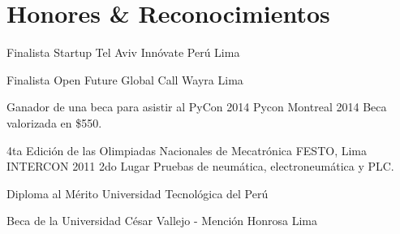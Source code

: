 \section{Honores \& Reconocimientos}

{Finalista Startup Tel Aviv}
{Innóvate Perú}
{Lima}
{}
{}

{Finalista Open Future Global Call}
{Wayra}
{Lima}
{}
{}

{Ganador de una beca para asistir al PyCon 2014}
{Pycon}
{Montreal 2014}
{}
{Beca valorizada en \$550.}

{4ta Edición de las Olimpiadas Nacionales de Mecatrónica}
{FESTO, Lima}
{INTERCON 2011}
{2do Lugar}
{Pruebas de neumática, electroneumática y PLC.}  

{Diploma al Mérito}
{Universidad Tecnológica del Perú}{}{}
{}  

{Beca de la Universidad César Vallejo - Mención Honrosa}
{Lima}
{}{}
{}  